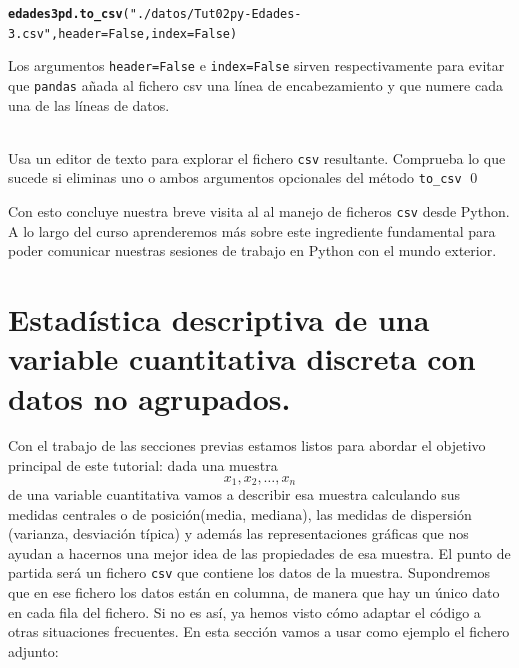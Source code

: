 \documentclass[10pt,a4paper]{article}\usepackage[]{graphicx}\usepackage[]{color}
\makeatletter
\newcommand{\hlstr}[1]{\textcolor[rgb]{0.192,0.494,0.8}{#1}}%
\newcommand{\hlstd}[1]{\textcolor[rgb]{0.345,0.345,0.345}{#1}}%
\newcommand{\hlkwc}[1]{\textcolor[rgb]{0.333,0.667,0.333}{#1}}%
\newcommand{\hlkwd}[1]{\textcolor[rgb]{0.737,0.353,0.396}{\textbf{#1}}}%
\newenvironment{kframe}{%
 \def\at@end@of@kframe{}%
 \ifinner\ifhmode%
  \def\at@end@of@kframe{\end{minipage}}%
  \begin{minipage}{\columnwidth}%
 \fi\fi%
 \def\FrameCommand##1{\hskip\@totalleftmargin \hskip-\fboxsep
 \colorbox{shadecolor}{##1}\hskip-\fboxsep
     \hskip-\linewidth \hskip-\@totalleftmargin \hskip\columnwidth}%
 \MakeFramed {\advance\hsize-\width
   \@totalleftmargin\z@ \linewidth\hsize
   \@setminipage}}%
 {\par\unskip\endMakeFramed%
 \at@end@of@kframe}
\newenvironment{knitrout}{}{} %
\newcounter {cont01}
\makeatother
\begin{document}
\begin{knitrout}
\color{fgcolor}\begin{kframe}
\begin{alltt}
\hlkwd{edades3pd.to_csv}\hlstd{(}\hlstr{"./datos/Tut02py-Edades-3.csv"}\hlstd{,} \hlkwc{header}\hlstd{=False,} \hlkwc{index}\hlstd{=False)}
\end{alltt}
\end{kframe}
\end{knitrout}
Los argumentos {\tt header=False} e {\tt index=False} sirven respectivamente para evitar que {\tt pandas} añada al fichero csv una línea de encabezamiento y que numere cada una de las líneas de datos.
\begin{ejercicio}
\label{tut02:ejercicio22}
\quad\\
Usa un editor de texto para explorar el fichero {\tt csv} resultante. Comprueba lo que sucede si eliminas uno o ambos argumentos opcionales del método  \verb#to_csv#
\qed
\end{ejercicio}
Con esto concluye nuestra breve visita al al manejo de ficheros {\tt csv} desde Python. A lo largo del curso aprenderemos más sobre este ingrediente fundamental para poder comunicar nuestras sesiones de trabajo en Python con el mundo exterior.

\section{Estadística descriptiva de una variable cuantitativa discreta con datos no agrupados.}
\label{tut02:sec:estadisticaDescriptiva}

Con el trabajo de las secciones previas estamos listos para abordar el objetivo principal de este tutorial: dada una muestra
\[
x_1, x_2, \ldots, x_n
\]
de una variable cuantitativa vamos a describir esa muestra calculando sus medidas centrales o de posición(media, mediana), las medidas de dispersión (varianza, desviación típica) y además las representaciones gráficas que nos ayudan a hacernos una mejor idea de las propiedades de esa muestra.
El punto de partida será un fichero {\tt csv} que contiene los datos de la muestra. Supondremos que en ese fichero los datos están en columna, de manera que hay un único dato en cada fila del fichero. Si no es así, ya hemos visto cómo adaptar el código a otras situaciones frecuentes. En esta sección vamos a usar como ejemplo el fichero adjunto:
\begin{center}
\end{center}
\end{document}
